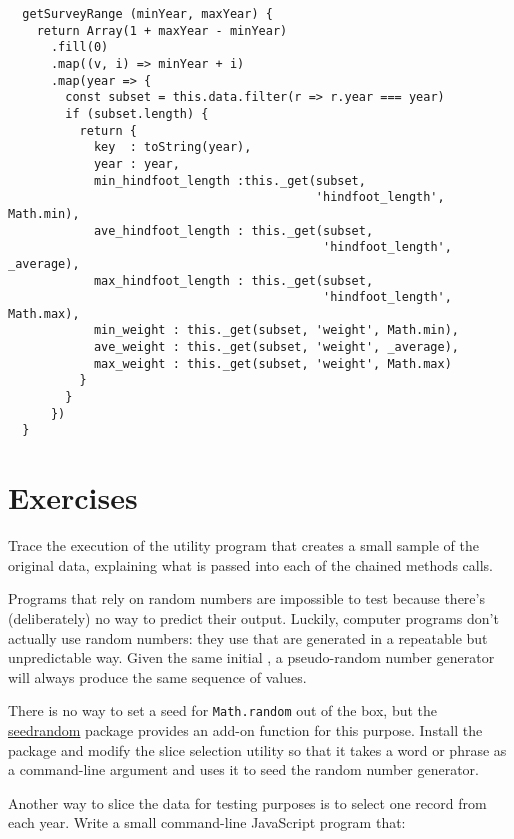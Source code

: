 \begin{verbatim}
  getSurveyRange (minYear, maxYear) {
    return Array(1 + maxYear - minYear)
      .fill(0)
      .map((v, i) => minYear + i)
      .map(year => {
        const subset = this.data.filter(r => r.year === year)
        if (subset.length) {
          return {
            key  : toString(year),
            year : year,
            min_hindfoot_length :this._get(subset,
                                           'hindfoot_length', Math.min),
            ave_hindfoot_length : this._get(subset,
                                            'hindfoot_length', _average),
            max_hindfoot_length : this._get(subset,
                                            'hindfoot_length', Math.max),
            min_weight : this._get(subset, 'weight', Math.min),
            ave_weight : this._get(subset, 'weight', _average),
            max_weight : this._get(subset, 'weight', Math.max)
          }
        }
      })
  }
\end{verbatim}

\section{Exercises}\label{s:dataman-exercises}


Trace the execution of the utility program that creates a small sample of the original data,
explaining what is passed into each of the chained methods calls.


Programs that rely on random numbers are impossible to test
because there's (deliberately) no way to predict their output.
Luckily, computer programs don't actually use random numbers:
they use 
that are generated in a repeatable but unpredictable way.
Given the same initial ,
a pseudo-random number generator will always produce the same sequence of values.

There is no way to set a seed for \texttt{Math.random} out of the box,
but the \href{https://www.npmjs.com/package/seedrandom}{seedrandom} package provides an add-on function for this purpose.
Install the package and modify the slice selection utility
so that it takes a word or phrase as a command-line argument
and uses it to seed the random number generator.


Another way to slice the data for testing purposes is to select one record from each year.
Write a small command-line JavaScript program that:

